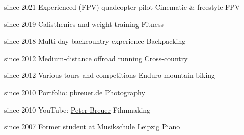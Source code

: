 
\vspace{3mm} 
\begin{cvhobbies}
    \cvhobby
    {since 2021}
    {Experienced (FPV) quadcopter pilot}
    {Cinematic \& freestyle FPV}
    
    \cvhobby
    {since 2019}
    {Calisthenics and weight training}
    {Fitness}
    
    \cvhobby
    {since 2018}
    {Multi-day backcountry experience}
    {Backpacking}
    
    \cvhobby
    {since 2012}
    {Medium-distance offroad running}
    {Cross-country}
    
    \cvhobby
    {since 2012}
    {Various tours and competitions}
    {Enduro mountain biking}
    
    \cvhobby
    {since 2010}
    {Portfolio: \href{https://pbreuer.de}{pbreuer.de}}
    {Photography}
    
    \cvhobby
    {since 2010}
    {YouTube: \href{https://www.youtube.com/channel/UCpW5zVz6mNaLRWC8l-Tq31A}{Peter Breuer}}
    {Filmmaking}
    
    \cvhobby
    {since 2007}
    {Former student at Musikschule Leipzig}
    {Piano}
\end{cvhobbies}